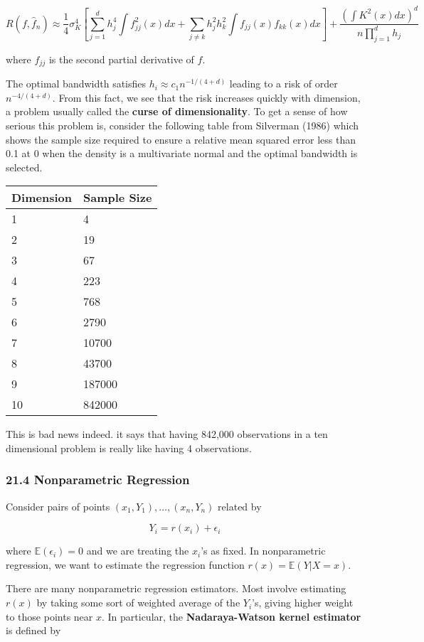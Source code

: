 \[
R(f, \hat{f}_n) 
\approx \frac{1}{4} \sigma_K^4 \left[ \sum_{j=1}^d h_j^4 \int f_{jj}^2(x) dx + \sum_{j \neq k} h_j^2 h_k^2 \int f_{jj}(x) f_{kk}(x) dx \right] + \frac{\left( \int K^2(x) dx\right)^d}{n \prod_{j=1}^d h_j}
\]

where \(f_{jj}\) is the second partial derivative of \(f\).

The optimal bandwidth satisfies \(h_i \approx c_1 n^{-1/(4 + d)}\)
leading to a risk of order \(n^{-4/(4+d)}\). From this fact, we see that
the risk increases quickly with dimension, a problem usually called the
\textbf{curse of dimensionality}. To get a sense of how serious this
problem is, consider the following table from Silverman (1986) which
shows the sample size required to ensure a relative mean squared error
less than 0.1 at 0 when the density is a multivariate normal and the
optimal bandwidth is selected.

\begin{longtable}[]{@{}ll@{}}
\toprule
Dimension & Sample Size \\
\midrule
\endhead
1 & 4 \\
2 & 19 \\
3 & 67 \\
4 & 223 \\
5 & 768 \\
6 & 2790 \\
7 & 10700 \\
8 & 43700 \\
9 & 187000 \\
10 & 842000 \\
\bottomrule
\end{longtable}

This is bad news indeed. it says that having 842,000 observations in a
ten dimensional problem is really like having 4 observations.

\subsubsection{21.4 Nonparametric Regression}\label{nonparametric-regression}

Consider pairs of points \((x_1, Y_1), \dots, (x_n, Y_n)\) related by

\[ Y_i = r(x_i) + \epsilon_i \]

where \(\mathbb{E}(\epsilon_i) = 0\) and we are treating the \(x_i\)'s
as fixed. In nonparametric regression, we want to estimate the
regression function \(r(x) = \mathbb{E}(Y | X = x)\).

There are many nonparametric regression estimators. Most involve
estimating \(r(x)\) by taking some sort of weighted average of the
\(Y_i\)'s, giving higher weight to those points near \(x\). In
particular, the \textbf{Nadaraya-Watson kernel estimator} is defined by

